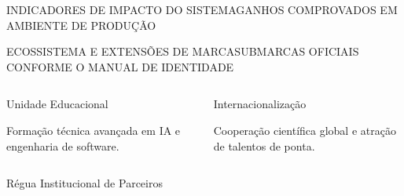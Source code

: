 \documentclass[aspectratio=169,t,xcolor=table]{beamer}
\begin{document}
\begin{frame}{INDICADORES DE IMPACTO DO SISTEMA}{GANHOS COMPROVADOS EM AMBIENTE DE PRODUÇÃO}
    \vspace{1.2em}
\end{frame}

\begin{frame}{ECOSSISTEMA E EXTENSÕES DE MARCA}{SUBMARCAS OFICIAIS CONFORME O MANUAL DE IDENTIDADE}
    \begin{columns}[c]
        \begin{ceiacard}[top=3pt, bottom=3pt]{Unidade Educacional}
            \centering\vspace{0.3em}
            \par\vspace{0.4em}
            {\scriptsize Formação técnica avançada em IA e engenharia de software.}
        \end{ceiacard}

        \begin{ceiacard}[top=3pt, bottom=3pt]{Internacionalização}
            \centering\vspace{0.3em}
            \par\vspace{0.4em}
            {\scriptsize Cooperação científica global e atração de talentos de ponta.}
        \end{ceiacard}
    \end{columns}
    \par\vspace{0.2em}
    \begin{ceiacard}[top=2pt, bottom=2pt]{Régua Institucional de Parceiros}
        \centering\vspace{0.1em}
        \ceiaregua[width=0.75\textwidth]\par
    \end{ceiacard}
\end{frame}
\end{document}
